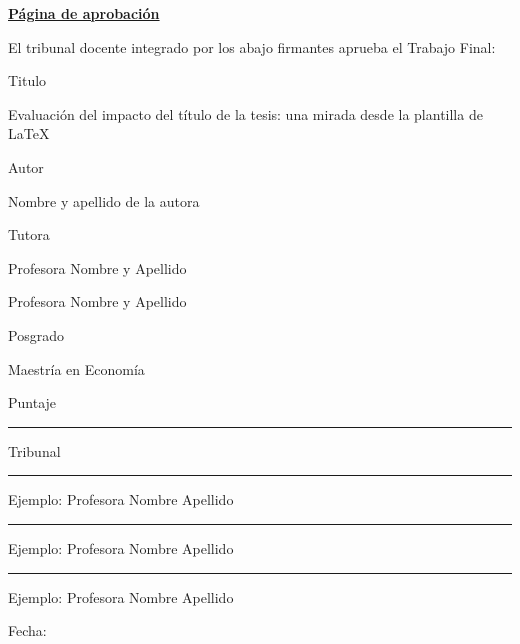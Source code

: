 \noindent{}

\Large \underline{\textbf{Página de aprobación}}

\vspace{3mm}

\normalsize El tribunal docente integrado por los abajo firmantes aprueba el Trabajo Final:

\vspace{3mm}

Titulo

Evaluación del impacto del título de la tesis: una mirada desde la plantilla de \LaTeX

\vspace{3mm}

Autor

Nombre y apellido de la autora

\vspace{3mm}

Tutora

Profesora Nombre y Apellido

Profesora Nombre y Apellido 

\vspace{3mm}

Posgrado

Maestría en Economía

\vspace{3mm}

Puntaje

\vspace{0.5cm}

\rule{3cm}{0.4pt}

\vspace{3mm}

Tribunal

\vspace{1cm}

\rule{9cm}{0.4pt}

\vspace{3mm}

Ejemplo: Profesora Nombre Apellido

\vspace{1cm}

\rule{9cm}{0.4pt}

\vspace{3mm}

Ejemplo: Profesora Nombre Apellido

\vspace{1cm}

\rule{9cm}{0.4pt}

\vspace{3mm}

Ejemplo: Profesora Nombre Apellido

\vspace{1cm}

Fecha:




\newpage
